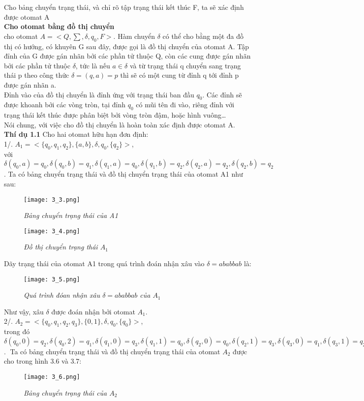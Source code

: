 \begin{flushleft}
Cho bảng chuyển trạng thái, và chỉ rõ tập trạng thái kết thúc F, ta sẽ xác định được otomat A\\
\textbf{Cho otomat bằng đồ thị chuyển}\\
cho otomat  $A = <Q, \sum, \delta, q_0, F>$. Hàm chuyển $\delta$ có thể cho bằng một đa đồ thị có hướng, có khuyên G sau đây, được gọi là đồ thị chuyển của otomat A. Tập đỉnh của G được gán nhãn bởi các phần tử thuộc Q, còn các cung được gán nhãn bởi các phần tử thuộc $\delta$, tức là nếu $a \in \delta$ và từ trạng thái q chuyển sang trạng thái p theo công thức $\delta = (q,a) = p$ thì sẽ có một cung từ đỉnh q tới đỉnh p được gán nhãn a.\\
Đỉnh vào của đồ thị chuyển là đỉnh ứng với trạng thái ban đầu $q_0$. Các đỉnh sẽ được khoanh bởi các vòng tròn, tại đỉnh $q_0$ có mũi tên đi vào, riêng đỉnh với trạng thái kết thúc được phân biệt bởi vòng tròn đậm, hoặc hình vuông…\\
Nói chung, với việc cho đồ thị chuyển là hoàn toàn xác định được otomat A.\\
\textbf{Thí dụ 1.1 } Cho hai otomat hữu hạn đơn định:\\
1/. $A_1 = <\{ q_0, q_1, q_2 \}, \{ a,b \}, \delta, q_0, \{ q_2 \}>$,\\
với $\delta(q_0, a) = q_0, \delta(q_0, b) = q_1, \delta(q_1, a) = q_0, \delta(q_1, b) = q_2, \delta(q_2, a) = q_2, \delta(q_2, b)=q_2$.
Ta có bảng chuyển trạng thái và đồ thị chuyển trạng thái của otomat A1 như sau:\\
\begin{figure}[ht]
\texttt{[image: 3\_3.png]}
\caption{ \textit{ Bảng chuyển trạng thái của A1} }
\end{figure}

\begin{figure}[ht]
\texttt{[image: 3\_4.png]}
\caption{ \textit{Đồ thị chuyển trạng thái $A_1$} }
\end{figure}
Dãy trạng thái của otomat A1 trong quá trình đoán nhận xâu vào $\delta = ababbab$ là:\\
\begin{figure}[ht]
\texttt{[image: 3\_5.png]}
\caption{ \textit{Quá trình đóan nhận xâu $\delta = ababbab$ của $A_1$} }
\end{figure}
Như vậy, xâu $\delta$ được đoán nhận bởi otomat $A_1$.\\
2/. $A_2 = <\{q_0,q_1,q_2,q_3\}, \{0,1\}, \delta, q_0, \{q_0\}>$, \\
trong đó $\delta(q_0, 0) = q_2, \delta(q_0, 2) = q_1, \delta(q_1, 0) = q_3, \delta(q_1, 1) = q_0, \delta(q_2, 0) = q_0, \delta(q_2, 1) = q_3, \delta(q_3, 0) = q_1, \delta(q_3, 1) = q_2$.
Ta có bảng chuyển trạng thái và đồ thị chuyển trạng thái của otomat $A_2$ được cho trong hình 3.6 và 3.7: 
\begin{figure}[ht]
\texttt{[image: 3\_6.png]}
\caption{ \textit{Bảng chuyển trạng thái của $A_2$} }
\end{figure}


\end{flushleft}
